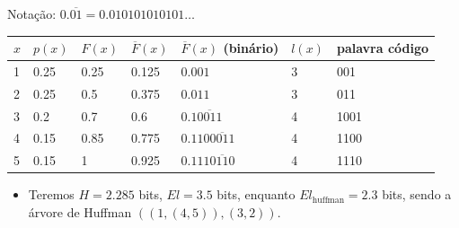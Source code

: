 \begin{frame}[allowframebreaks]
  \begin{example}
  Notação: $0.\overline{01} = 0.010101010101\ldots$
        \begin{tabular}{lllllll}
        $x$ & $p(x)$ & $F(x)$ & $\overline{F}(x)$    & $\overline{F}(x)$ (binário) & $l(x)$ & palavra código \\ \hline
        1   & 0.25   & 0.25   & 0.125           & $0.001$                 & 3     & 001   \\
        2   & 0.25   & 0.5    & 0.375           & $0.011$                 & 3     & 011   \\
        3   & 0.2    & 0.7    & 0.6             & $0.1\overline{0011}$         & 4     & 1001  \\
        4   & 0.15   & 0.85   & 0.775           & $0.110\overline{0011}$       & 4     & 1100  \\
	5   & 0.15   & 1      & 0.925       	& $0.111\overline{0110}$	  & 4	  & 1110
        \end{tabular}
	\begin{itemize}
	\item Teremos $H=2.285$ bits, $El = 3.5$ bits, enquanto $El_{\text{huffman}} = 2.3$ bits,
		sendo a árvore de Huffman $((1,(4,5)),(3,2))$.
	\end{itemize} 
  \end{example}

\end{frame}


